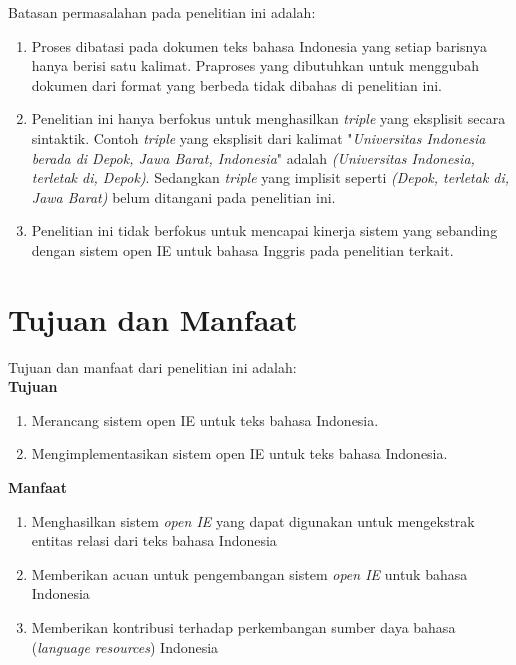 Batasan permasalahan pada penelitian ini adalah:

\begin{enumerate}
\item Proses dibatasi pada dokumen teks bahasa Indonesia yang setiap barisnya hanya berisi satu kalimat. Praproses yang dibutuhkan untuk menggubah dokumen dari format yang berbeda tidak dibahas di penelitian ini.

\item Penelitian ini hanya berfokus untuk menghasilkan \textit{triple} yang eksplisit secara sintaktik. Contoh \textit{triple} yang eksplisit dari kalimat "\textit{Universitas Indonesia berada di Depok, Jawa Barat, Indonesia}" adalah \textit{(Universitas Indonesia, terletak di, Depok)}. Sedangkan \textit{triple} yang implisit seperti \textit{(Depok, terletak di, Jawa Barat)} belum ditangani pada penelitian ini.

\item Penelitian ini tidak berfokus untuk mencapai kinerja sistem yang sebanding dengan sistem open IE untuk bahasa Inggris pada penelitian terkait.

\end{enumerate}

\section{Tujuan dan Manfaat}

Tujuan dan manfaat dari penelitian ini adalah:\\

\textbf{Tujuan}

\begin{enumerate}
\item Merancang sistem open IE untuk teks bahasa Indonesia.

\item Mengimplementasikan sistem open IE untuk teks bahasa Indonesia.
\end{enumerate}

\textbf{Manfaat}

\begin{enumerate}
\item Menghasilkan sistem \textit{open IE} yang dapat digunakan untuk mengekstrak entitas relasi dari teks bahasa Indonesia

\item Memberikan acuan untuk pengembangan sistem \textit{open IE} untuk bahasa Indonesia

\item Memberikan kontribusi terhadap perkembangan sumber daya bahasa (\textit{language resources}) Indonesia
\end{enumerate}

